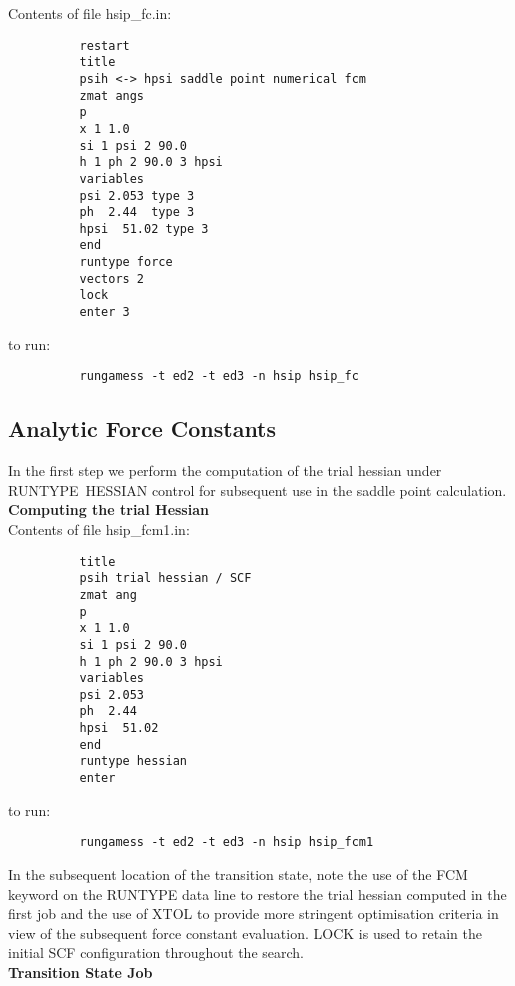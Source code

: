 \documentclass[11pt,fleqn]{article}
\begin{document}
Contents of file hsip\_fc.in:
{
\footnotesize
\begin{verbatim}
          restart 
          title
          psih <-> hpsi saddle point numerical fcm
          zmat angs
          p
          x 1 1.0
          si 1 psi 2 90.0
          h 1 ph 2 90.0 3 hpsi
          variables
          psi 2.053 type 3
          ph  2.44  type 3
          hpsi  51.02 type 3
          end
          runtype force
          vectors 2
          lock
          enter 3
\end{verbatim}
}
to run:
{
\footnotesize
\begin{verbatim}
          rungamess -t ed2 -t ed3 -n hsip hsip_fc
\end{verbatim}
}

\subsection[Analytic Force Constants]{Analytic Force Constants}

In the first step we perform the computation of the trial
hessian under RUNTYPE~HESSIAN control for subsequent use in the
saddle point calculation.\\

{\bf Computing the trial Hessian}\\

Contents of file hsip\_fcm1.in:
{
\footnotesize
\begin{verbatim}
          title
          psih trial hessian / SCF 
          zmat ang
          p
          x 1 1.0
          si 1 psi 2 90.0
          h 1 ph 2 90.0 3 hpsi
          variables
          psi 2.053 
          ph  2.44  
          hpsi  51.02 
          end
          runtype hessian
          enter
\end{verbatim}
}
to run:
{
\footnotesize
\begin{verbatim}
          rungamess -t ed2 -t ed3 -n hsip hsip_fcm1
\end{verbatim}
}
In the subsequent location of the transition state, note the use of
the FCM keyword on the RUNTYPE data line to restore the trial hessian
computed in the first job and the use of XTOL to provide  more stringent
optimisation criteria in view of the subsequent force constant evaluation.
LOCK is used to   retain the initial SCF  configuration throughout
the search.\\

{\bf Transition State Job}\\
\end{document}
